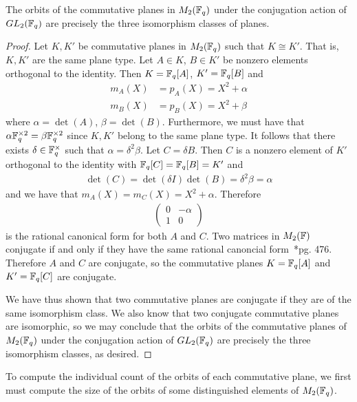 \documentclass{amsart}
\begin{document}
\begin{theorem}\label{plane-orbits}
    The orbits of the commutative planes in $M_2(\protect\mathbb{F}_q)$ under the conjugation action of $GL_2(\protect\mathbb{F}_q)$ are precisely the three isomorphism classes of planes.
\end{theorem}
\begin{proof}
    Let $K, K'$ be commutative planes in $M_2(\protect\mathbb{F}_q)$ such that $K \cong K'$. That is, $K, K'$ are the same plane type. Let $A \in K$, $B \in K'$ be nonzero elements orthogonal to the identity. Then $K = \protect\mathbb{F}_q[A]$, $K' = \protect\mathbb{F}_q[B]$ and 
    \begin{align*}
        m_A(X) &= p_A(X) = X^2 + \alpha \\
        m_B(X) &= p_B(X) = X^2 + \beta
    \end{align*}
    where $\alpha = \det(A)$, $\beta = \det(B)$. Furthermore, we must have that $\alpha \protect\mathbb{F}_q^{\times2} = \beta \protect\mathbb{F}_q^{\times2}$ since $K, K'$ belong to the same plane type. It follows that there exists $\delta \in \protect\mathbb{F}_q^{\times}$ such that $\alpha = \delta^2 \beta$. Let $C = \delta B$. Then $C$ is a nonzero element of $K'$ orthogonal to the identity with $\protect\mathbb{F}_q[C] = \protect\mathbb{F}_q[B] = K'$ and 
    \begin{align*}
        \det(C) = \det(\delta I)\det(B) = \delta^2 \beta = \alpha
    \end{align*}
    and we have that $m_A(X) = m_C(X) = X^2 + \alpha$. Therefore
    \begin{align*}
        \left(\begin{matrix}
            0 & -\alpha \\
            1 & 0
        \end{matrix}\right)
    \end{align*}
    is the rational canonical form for both $A$ and $C$. Two matrices in $M_2(\protect\mathbb{F})$ conjugate if and only if they have the same rational canoncial form~\cite{DandF}*{pg. 476}. Therefore $A$ and $C$ are conjugate, so the commutative planes $K = \protect\mathbb{F}_q[A]$ and $K' = \protect\mathbb{F}_q[C]$ are conjugate.
    
    We have thus shown that two commutative planes are conjugate if they are of the same isomorphism class. We also know that two conjugate commutative planes are isomorphic, so we may conclude that the orbits of the commutative planes of $M_2(\protect\mathbb{F}_q)$ under the conjugation action of $GL_2(\protect\mathbb{F}_q)$ are precisely the three isomorphism classes, as desired.
\end{proof}

To compute the individual count of the orbits of each commutative plane, we first must compute the size of the orbits of some distinguished elements of $M_2(\protect\mathbb{F}_q)$.
\end{document}
